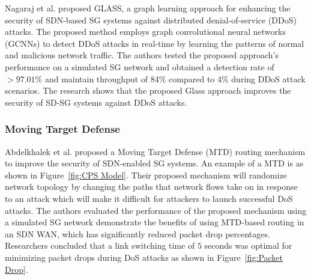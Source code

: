 \documentclass[conference]{IEEEtran}
\begin{document}
Nagaraj et al. \cite{nagaraj2021glass} proposed GLASS, a graph learning approach for enhancing the security of SDN-based SG systems against distributed denial-of-service (DDoS) attacks. The proposed method employs graph convolutional neural networks (GCNNs) to detect DDoS attacks in real-time by learning the patterns of normal and malicious network traffic. The authors tested the proposed approach's performance on a simulated SG network and obtained a detection rate of $>97.01\%$ and maintain throughput of 84\% compared to 4\% during DDoS attack scenarios. The research shows that the proposed Glass approach improves the security of SD-SG systems against DDoS attacks.


\subsubsection{Moving Target Defense} Abdelkhalek et al. \cite{abdelkhalek2022moving} proposed a Moving Target Defense (MTD) routing mechanism to improve the security of SDN-enabled SG systems. An example of a MTD is as shown in Figure~\ref{fig:CPS Model}. Their proposed mechanism will randomize network topology by changing the paths that network flows take on in response to an attack which will make it difficult for attackers to launch successful DoS attacks. The authors evaluated the performance of the proposed mechanism using a simulated SG network demonstrate the benefits of using MTD-based routing in an SDN WAN, which has significantly reduced packet drop percentages. Researchers concluded that a link switching time of $5$ seconds was optimal for minimizing packet drops during DoS attacks as shown in Figure~\ref{fig:Packet Drop}.
\end{document}

